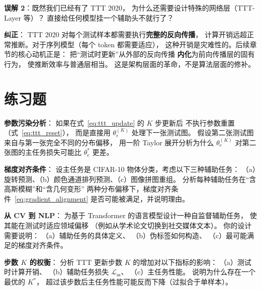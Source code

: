 \begin{misconceptionbox}
\textbf{误解 2}：既然我们已经有了 TTT 2020，
为什么还需要设计特殊的网络层（TTT-Layer 等）？
直接给任何模型挂一个辅助头不就行了？

\textbf{纠正}：
TTT 2020 对每个测试样本都需要执行\textbf{完整的反向传播}，
计算开销远超正常推断。对于序列模型（每个 token 都需要适应），
这种开销是灾难性的。后续章节的核心动机正是：
把``测试时更新''从外部的反向传播
\textbf{内化}为前向传播层的固有行为，
使推断效率与普通层相当。
这是架构层面的革命，不是算法层面的修补。
\end{misconceptionbox}

\section{练习题}
\label{sec:why_test_time_exercises}

\begin{exercise}
\textbf{参数污染分析}：
如果在式~\eqref{eq:ttt_update} 的 $K$ 步更新后
不执行参数重置（式~\eqref{eq:ttt_reset}），
而是直接用 $\theta_e^{(K)}$ 处理下一张测试图。
假设第二张测试图来自与第一张完全不同的分布偏移，
用一阶 Taylor 展开分析为什么 $\theta_e^{(K)}$
对第二张图的主任务损失可能比 $\theta_e^*$ 更差。
\end{exercise}

\begin{exercise}
\textbf{梯度对齐条件}：
设主任务是 CIFAR-10 物体分类，考虑以下三种辅助任务：
（a）旋转预测、（b）颜色通道排列预测、（c）图像拼图重组。
分析每种辅助任务在``含高斯模糊''和``含几何变形''
两种分布偏移下，梯度对齐条件~\eqref{eq:gradient_alignment}
是否可能被满足，并说明理由。
\end{exercise}

\begin{exercise}
\textbf{从 CV 到 NLP}：
为基于 Transformer 的语言模型设计一种自监督辅助任务，
使其能在测试时适应领域偏移
（例如从学术论文切换到社交媒体文本）。
你的设计需要说明：
（a）辅助任务的具体定义、
（b）伪标签如何构造、
（c）最可能满足的梯度对齐条件。
\end{exercise}

\begin{exercise}
\textbf{步数 $K$ 的权衡}：
分析 TTT 更新步数 $K$ 的增加对以下指标的影响：
（a）测试时计算开销、
（b）辅助任务损失 $\mathcal{L}_\text{ss}$、
（c）主任务性能。
说明为什么存在一个最优的 $K^*$，
超过该步数后主任务性能可能反而下降（过拟合于单样本）。
\end{exercise}


